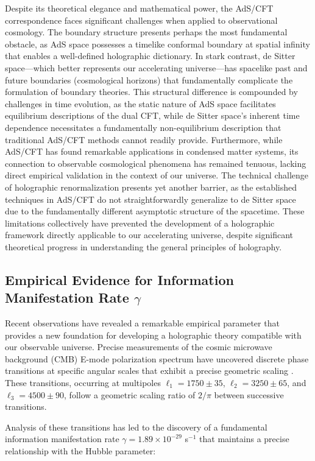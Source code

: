 \documentclass[11pt,english,twoside]{article}
\theoremstyle{plain}
\theoremstyle{definition}
\theoremstyle{remark}
\newcommand{\gammaR}{\gamma}
\begin{document}
Despite its theoretical elegance and mathematical power, the AdS/CFT correspondence faces significant challenges when applied to observational cosmology. The boundary structure presents perhaps the most fundamental obstacle, as AdS space possesses a timelike conformal boundary at spatial infinity that enables a well-defined holographic dictionary. In stark contrast, de Sitter space—which better represents our accelerating universe—has spacelike past and future boundaries (cosmological horizons) that fundamentally complicate the formulation of boundary theories. This structural difference is compounded by challenges in time evolution, as the static nature of AdS space facilitates equilibrium descriptions of the dual CFT, while de Sitter space's inherent time dependence necessitates a fundamentally non-equilibrium description that traditional AdS/CFT methods cannot readily provide. Furthermore, while AdS/CFT has found remarkable applications in condensed matter systems, its connection to observable cosmological phenomena has remained tenuous, lacking direct empirical validation in the context of our universe. The technical challenge of holographic renormalization presents yet another barrier, as the established techniques in AdS/CFT do not straightforwardly generalize to de Sitter space due to the fundamentally different asymptotic structure of the spacetime. These limitations collectively have prevented the development of a holographic framework directly applicable to our accelerating universe, despite significant theoretical progress in understanding the general principles of holography.

\subsection{Empirical Evidence for Information Manifestation Rate $\gammaR$}
\label{subsec:empirical}

Recent observations have revealed a remarkable empirical parameter that provides a new foundation for developing a holographic theory compatible with our observable universe. Precise measurements of the cosmic microwave background (CMB) E-mode polarization spectrum have uncovered discrete phase transitions at specific angular scales that exhibit a precise geometric scaling \cite{Weiner2024}. These transitions, occurring at multipoles $\ell_1 = 1750 \pm 35$, $\ell_2 = 3250 \pm 65$, and $\ell_3 = 4500 \pm 90$, follow a geometric scaling ratio of $2/\pi$ between successive transitions.

Analysis of these transitions has led to the discovery of a fundamental information manifestation rate $\gammaR = 1.89 \times 10^{-29}$ s$^{-1}$ that maintains a precise relationship with the Hubble parameter:
\end{document}
